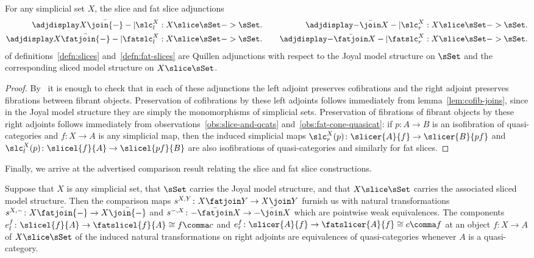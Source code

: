   \begin{lem}\label{lem:slices-quillen}
 For any simplicial set $X$, the slice and fat slice adjunctions
    \begin{align*}
  		\adjdisplay \textstyle X\bar\join{-}-|\textstyle \slc^X_l:X\slice\sSet->\sSet. & 
      \mkern20mu & 
  		\adjdisplay \textstyle {-}\bar\join X-|\textstyle \slc^X_r:X\slice\sSet->\sSet. \\
  		\adjdisplay \textstyle X\bar\fatjoin{-}-|\textstyle \fatslc^X_l:X\slice\sSet->\sSet. & 
      \mkern20mu & 
  		\adjdisplay \textstyle {-}\bar\fatjoin X-|\textstyle \fatslc^X_r:X\slice\sSet->\sSet.
    \end{align*}
    of definitions~\ref{defn:slices} and~\ref{defn:fat-slices} are Quillen adjunctions with respect to the Joyal model structure on $\sSet$ and the corresponding sliced model structure on $X\slice\sSet$.
  \end{lem}
  
  \begin{proof}
    By~\cite[7.15]{Joyal:2007kk} it is enough to check that in each of these adjunctions the left adjoint preserves cofibrations and the right adjoint preserves fibrations between fibrant objects. Preservation of cofibrations by these left adjoints follows immediately from lemma~\ref{lem:cofib-joins}, since in the Joyal model structure they are simply the monomorphisms of simplicial sets. Preservation of fibrations of fibrant objects by these right adjoints follows immediately from observations~\ref{obs:slice-and-qcats} and~\ref{obs:fat-cone-quasicat}: if $p \colon A \to B$ is an isofibration of quasi-categories and $f \colon X \to A$ is any simplicial map, then the induced simplicial maps $\slc^X_r(p)\colon \slicer{A}{f}\to \slicer{B}{pf}$ and $\slc^X_l(p)\colon \slicel{f}{A}\to \slicel{pf}{B}$ are also isofibrations of quasi-categories and similarly for fat slices.
  \end{proof}
  
  Finally, we arrive at the advertised comparison result relating the slice and fat slice constructions.
  
  \begin{prop}\label{prop:slice-fatslice-equiv}
    Suppose that $X$ is any simplicial set, that $\sSet$ carries the Joyal model structure, and that $X\slice\sSet$ carries the associated sliced model structure. Then the comparison maps $s^{X,Y}\colon X\fatjoin Y\to X\join Y$ furnish us with natural transformations $s^{X,{-}}\colon X\bar\fatjoin{-}\to X\bar\join{-}$ and $s^{{-},X}\colon {-}\bar\fatjoin X\to {-}\bar\join X$ which are pointwise weak equivalences. The components $e_l^f\colon \slicel{f}{A}\to \fatslicel{f}{A} \cong f\comma c$ and $e_r^f\colon \slicer{A}{f}\to \fatslicer{A}{f}\cong c\comma f$ at an object $f\colon X\to A$ of $X\slice\sSet$ of the induced natural transformations on right adjoints  are equivalences of quasi-categories whenever $A$ is a quasi-category.
  \end{prop}
  
